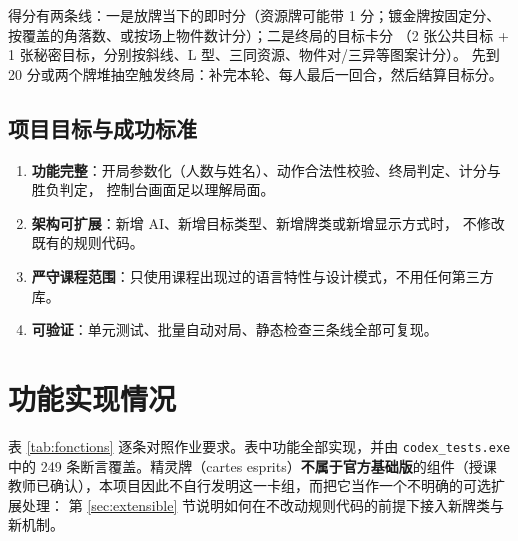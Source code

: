 \documentclass[11pt,a4paper]{ctexart}
\newcommand{\cl}[1]{\texttt{#1}}
\begin{document}
得分有两条线：一是放牌当下的即时分（资源牌可能带 1 分；镀金牌按固定分、
按覆盖的角落数、或按场上物件数计分）；二是终局的目标卡分
（2 张公共目标 + 1 张秘密目标，分别按斜线、L 型、三同资源、物件对/三异等图案计分）。
先到 20 分或两个牌堆抽空触发终局：补完本轮、每人最后一回合，然后结算目标分。

\subsection{项目目标与成功标准}
\begin{enumerate}
\item \textbf{功能完整}：开局参数化（人数与姓名）、动作合法性校验、终局判定、计分与胜负判定，
      控制台画面足以理解局面。
\item \textbf{架构可扩展}：新增 AI、新增目标类型、新增牌类或新增显示方式时，
      不修改既有的规则代码。
\item \textbf{严守课程范围}：只使用课程出现过的语言特性与设计模式，不用任何第三方库。
\item \textbf{可验证}：单元测试、批量自动对局、静态检查三条线全部可复现。
\end{enumerate}


\section{功能实现情况}

表 \ref{tab:fonctions} 逐条对照作业要求。表中功能全部实现，并由 \cl{codex\_tests.exe}
中的 249 条断言覆盖。精灵牌（cartes esprits）\textbf{不属于官方基础版}的组件（授课
教师已确认），本项目因此不自行发明这一卡组，而把它当作一个不明确的可选扩展处理：
第 \ref{sec:extensible} 节说明如何在不改动规则代码的前提下接入新牌类与新机制。
\end{document}

